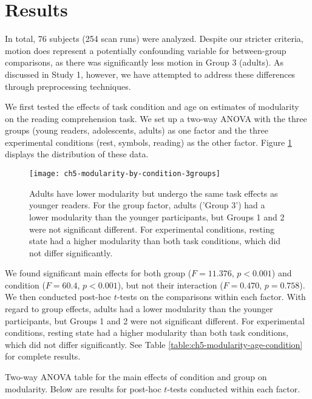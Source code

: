 \section{Results}

In total, 76 subjects (254 scan runs) were analyzed. Despite our stricter criteria, motion does represent a potentially confounding variable for between-group comparisons, as there was significantly less motion in Group 3 (adults). As discussed in Study 1, however, we have attempted to address these differences through preprocessing techniques.

We first tested the effects of task condition and age on estimates of modularity on the reading comprehension task. We set up a two-way ANOVA with the three groups (young readers, adolescents, adults) as one factor and the three experimental conditions (rest, symbols, reading) as the other factor. Figure \ref{fig:ch5-modularity-by-condition-3groups} displays the distribution of these data. 

\begin{figure}[t]
	\centering
	\texttt{[image: ch5-modularity-by-condition-3groups]}
    \caption[Adults have lower modularity but undergo the same task effects as younger readers]{Adults have lower modularity but undergo the same task effects as younger readers. For the group factor, adults ('Group 3') had a lower modularity than the younger participants, but Groups 1 and 2 were not significant different. For experimental conditions, resting state had a higher modularity than both task conditions, which did not differ significantly.}
	\label{fig:ch5-modularity-by-condition-3groups}
\end{figure}

We found significant main effects for both group ($F = 11.376$, $p < 0.001$) and condition ($F = 60.4$, $p < 0.001$), but not their interaction ($F=0.470$, $p = 0.758$). We then conducted post-hoc $t$-tests on the comparisons within each factor. With regard to group effects, adults had a lower modularity than the younger participants, but Groups 1 and 2 were not significant different. For experimental conditions, resting state had a higher modularity than both task conditions, which did not differ significantly. See Table \ref{table:ch5-modularity-age-condition} for complete results. 

\begin{table}[t]
	\renewcommand{\tabcolsep}{0.09cm}
	\centering
	
	\caption[Statistical results for the effects of condition and group on modularity]{Two-way ANOVA table for the main effects of condition and group on modularity. Below are results for post-hoc $t$-tests conducted within each factor.}
	\label{table:ch5-modularity-age-condition}
\end{table}

